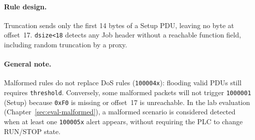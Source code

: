 \documentclass[../main.tex]{subfiles}
\begin{document}
\paragraph{Rule design.}
Truncation sends only the first 14 bytes of a Setup PDU, leaving no byte at offset~17. \texttt{dsize<18} detects any Job header without a reachable function field, including random truncation by a proxy.

\paragraph{General note.}
Malformed rules do not replace DoS rules (\texttt{100004x}): flooding valid PDUs still requires \texttt{threshold}. Conversely, some malformed packets will not trigger \texttt{1000001} (Setup) because \texttt{0xF0} is missing or offset~17 is unreachable. In the lab evaluation (Chapter~\ref{sec:eval-malformed}), a malformed scenario is considered detected when at least one \texttt{100005x} alert appears, without requiring the PLC to change RUN/STOP state.
\end{document}
